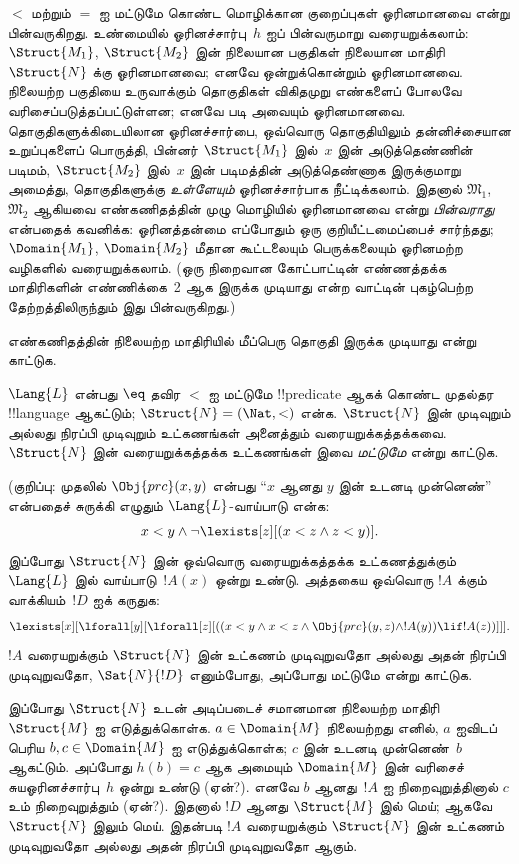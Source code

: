 \documentclass[11pt,a4paper,openany]{memoir}
\begin{document}
$<$ மற்றும் $=$ ஐ மட்டுமே கொண்ட மொழிக்கான
குறைப்புகள் ஓரினமானவை என்று பின்வருகிறது.
உண்மையில் ஓரினச்சார்பு~$h$ ஐப்
பின்வருமாறு வரையறுக்கலாம்:
$\Struct{M_1}$, $\Struct{M_2}$
இன் நிலையான பகுதிகள் நிலையான மாதிரி
$\Struct{N}$ க்கு ஓரினமானவை;
எனவே ஒன்றுக்கொன்றும் ஓரினமானவை.
நிலையற்ற பகுதியை உருவாக்கும் தொகுதிகள்
விகிதமுறு எண்களைப் போலவே வரிசைப்படுத்தப்பட்டுள்ளன;
எனவே  படி
அவையும் ஓரினமானவை. தொகுதிகளுக்கிடையிலான
ஓரினச்சார்பை, ஒவ்வொரு தொகுதியிலும்
தன்னிச்சையான உறுப்புகளைப் பொருத்தி,
பின்னர் $\Struct{M_1}$ இல்~$x$
இன் அடுத்தெண்ணின் படிமம்,
$\Struct{M_2}$ இல்~$x$ இன் படிமத்தின்
அடுத்தெண்ணாக இருக்குமாறு அமைத்து,
தொகுதிகளுக்கு \emph{உள்ளேயும்}
ஓரினச்சார்பாக நீட்டிக்கலாம்.
இதனால் $\mathfrak{M}_1$,
$\mathfrak{M}_2$ ஆகியவை எண்கணிதத்தின்
முழு மொழியில் ஓரினமானவை என்று
\emph{பின்வராது} என்பதைக் கவனிக்க:
ஓரினத்தன்மை எப்போதும் ஒரு
குறியீட்டமைப்பைச் சார்ந்தது;
$\Domain{M_1}$, $\Domain{M_2}$
மீதான கூட்டலையும் பெருக்கலையும்
ஓரினமற்ற வழிகளில் வரையறுக்கலாம்.
(ஒரு நிறைவான கோட்பாட்டின்
எண்ணத்தக்க மாதிரிகளின் எண்ணிக்கை~2
ஆக இருக்க முடியாது என்ற வாட்டின்
புகழ்பெற்ற தேற்றத்திலிருந்தும்
இது பின்வருகிறது.)

\begin{prob}
எண்கணிதத்தின் நிலையற்ற மாதிரியில்
மீப்பெரு தொகுதி இருக்க முடியாது என்று காட்டுக.
\end{prob}

\begin{prob}
$\Lang{L}$ என்பது $\eq$ தவிர
$<$ ஐ மட்டுமே !!{predicate}
ஆகக் கொண்ட முதல்தர !!{language}
ஆகட்டும்; $\Struct{N} = (\Nat,
<)$ என்க. $\Struct{N}$ இன்
முடிவுறும் அல்லது நிரப்பி முடிவுறும்
உட்கணங்கள் அனைத்தும் வரையறுக்கத்தக்கவை.
$\Struct{N}$ இன் வரையறுக்கத்தக்க
உட்கணங்கள் இவை \emph{மட்டுமே}
என்று காட்டுக.

(குறிப்பு: முதலில்
$\Obj{prc}(x,y)$ என்பது
“$x$ ஆனது $y$ இன் உடனடி முன்னெண்”
என்பதைச் சுருக்கி எழுதும்
$\Lang{L}$-வாய்பாடு என்க:
\[
x<y \land \lnot \lexists[z][(x<z \land z < y)].
\]
இப்போது $\Struct{N}$ இன் ஒவ்வொரு
வரையறுக்கத்தக்க உட்கணத்துக்கும்
$\Lang{L}$ இல் வாய்பாடு~$!A(x)$
ஒன்று உண்டு. அத்தகைய ஒவ்வொரு
$!A$ க்கும் வாக்கியம்~$!D$ ஐக் கருதுக:
\[
\lexists[x][\lforall[y][\lforall[z][((x<y \land x<z \land \Obj{prc}(y,z)
  \land !A(y)) \lif !A(z))]]].
\]
$!A$ வரையறுக்கும் $\Struct{N}$
இன் உட்கணம் முடிவுறுவதோ அல்லது
அதன் நிரப்பி முடிவுறுவதோ,
$\Sat{N}{!D}$ எனும்போது,
அப்போது மட்டுமே என்று காட்டுக.

இப்போது $\Struct{N}$ உடன்
அடிப்படைச் சமானமான நிலையற்ற
மாதிரி~$\Struct{M}$ ஐ எடுத்துக்கொள்க.
$a \in \Domain{M}$ நிலையற்றது எனில்,
$a$ ஐவிடப் பெரிய
$b, c \in \Domain{M}$ ஐ எடுத்துக்கொள்க;
$c$ இன் உடனடி முன்னெண்~$b$
ஆகட்டும். அப்போது $h(b)=c$
ஆக அமையும் $\Domain{M}$ இன்
வரிசைச் சுயஓரினச்சார்பு~$h$
ஒன்று உண்டு (ஏன்?).
எனவே $b$ ஆனது~$!A$ ஐ
நிறைவுறுத்தினால் $c$ உம்
நிறைவுறுத்தும் (ஏன்?).
இதனால் $!D$ ஆனது
$\Struct{M}$ இல் மெய்;
ஆகவே $\Struct{N}$ இலும் மெய்.
இதன்படி $!A$ வரையறுக்கும்
$\Struct{N}$ இன் உட்கணம்
முடிவுறுவதோ அல்லது
அதன் நிரப்பி முடிவுறுவதோ
ஆகும்.
\end{prob}
\end{document}
